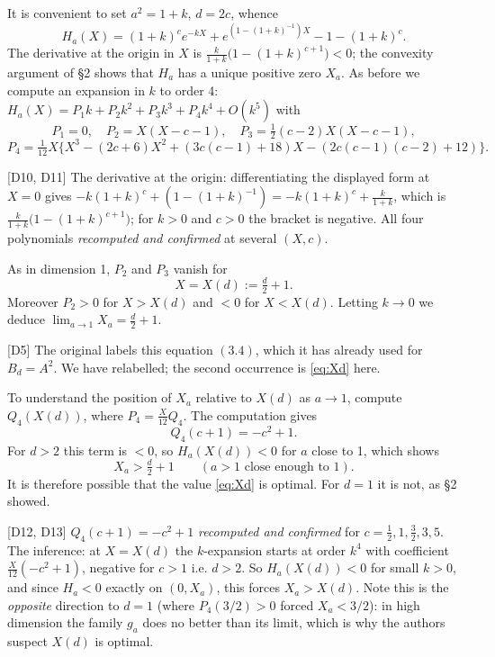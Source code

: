 \documentclass[11pt,reqno]{amsart}
\theoremstyle{plain}
\theoremstyle{definition}
\theoremstyle{remark}
\newcommand{\Ledger}[1]{{\scriptsize\textsf{[#1]}}}
\begin{document}
It is convenient to set $a^2=1+k$, $d=2c$, whence
\[H_a(X)=(1+k)^ce^{-kX}+e^{(1-(1+k)^{-1})X}-1-(1+k)^c .\]
The derivative at the origin in $X$ is
$\frac{k}{1+k}\bigl(1-(1+k)^{c+1}\bigr)<0$; the convexity argument of \S2 shows that
$H_a$ has a unique positive zero $X_a$. As before we compute an expansion in $k$ to
order 4:
$H_a(X)=P_1k+P_2k^2+P_3k^3+P_4k^4+O(k^5)$ with
\[P_1=0,\quad P_2=X(X-c-1),\quad P_3=\tfrac12(c-2)X(X-c-1),\]
\[P_4=\tfrac1{12}X\bigl\{X^3-(2c+6)X^2+(3c(c-1)+18)X-(2c(c-1)(c-2)+12)\bigr\}.\]

\begin{expansion}
\Ledger{D10, D11} The derivative at the origin: differentiating the displayed form at
$X=0$ gives $-k(1+k)^c+(1-(1+k)^{-1})=-k(1+k)^c+\frac{k}{1+k}$, which is
$\frac{k}{1+k}\bigl(1-(1+k)^{c+1}\bigr)$; for $k>0$ and $c>0$ the bracket is negative.
All four polynomials \emph{recomputed and confirmed} at several $(X,c)$.
\end{expansion}

As in dimension 1, $P_2$ and $P_3$ vanish for
\begin{equation}\label{eq:Xd}
 X=X(d):=\tfrac d2+1 .
\end{equation}
Moreover $P_2>0$ for $X>X(d)$ and $<0$ for $X<X(d)$. Letting $k\to0$ we deduce
$\lim_{a\to1}X_a=\tfrac d2+1$.

\begin{ournotation}
\Ledger{D5} The original labels this equation $(3.4)$, which it has already used for
$B_d=A^2$. We have relabelled; the second occurrence is \eqref{eq:Xd} here.
\end{ournotation}

To understand the position of $X_a$ relative to $X(d)$ as $a\to1$, compute
$Q_4(X(d))$, where $P_4=\tfrac X{12}Q_4$. The computation gives
\[Q_4(c+1)=-c^2+1 .\]
For $d>2$ this term is $<0$, so $H_a(X(d))<0$ for $a$ close to 1, which shows
\[X_a>\tfrac d2+1\qquad(a>1\text{ close enough to }1).\]
It is therefore possible that the value \eqref{eq:Xd} is optimal. For $d=1$ it is
not, as \S2 showed.

\begin{expansion}
\Ledger{D12, D13} $Q_4(c+1)=-c^2+1$ \emph{recomputed and confirmed} for
$c=\tfrac12,1,\tfrac32,3,5$. The inference: at $X=X(d)$ the $k$-expansion starts at
order $k^4$ with coefficient $\tfrac{X}{12}(-c^2+1)$, negative for $c>1$ i.e. $d>2$.
So $H_a(X(d))<0$ for small $k>0$, and since $H_a<0$ exactly on $(0,X_a)$, this forces
$X_a>X(d)$. Note this is the \emph{opposite} direction to $d=1$ (where
$P_4(3/2)>0$ forced $X_a<3/2$): in high dimension the family $g_a$ does no better
than its limit, which is why the authors suspect $X(d)$ is optimal.
\end{expansion}
\end{document}
